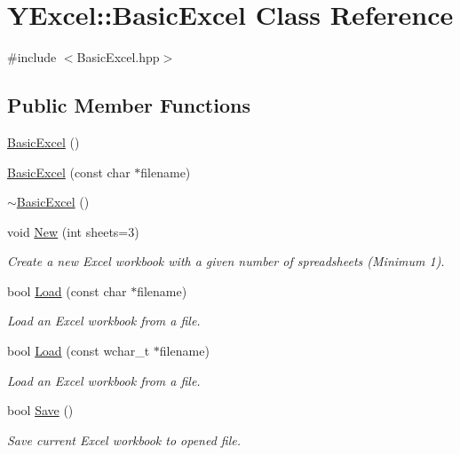 \hypertarget{class_y_excel_1_1_basic_excel}{}\section{Y\+Excel\+:\+:Basic\+Excel Class Reference}
\label{class_y_excel_1_1_basic_excel}


{\ttfamily \#include $<$Basic\+Excel.\+hpp$>$}

\subsection*{Public Member Functions}
\begin{DoxyCompactItemize}
\item 
\hyperlink{class_y_excel_1_1_basic_excel_ad2cb116dc96aa380399de4c1d0a93eb7}{Basic\+Excel} ()
\item 
\hyperlink{class_y_excel_1_1_basic_excel_ade0a7e1f99dc56cea809c7db31b34f05}{Basic\+Excel} (const char $\ast$filename)
\item 
\hyperlink{class_y_excel_1_1_basic_excel_a5f0fba85f6f0d10706430f0f00f93945}{$\sim$\+Basic\+Excel} ()
\item 
void \hyperlink{class_y_excel_1_1_basic_excel_a61cbf0e9d5bca97c10df212f8219b6f1}{New} (int sheets=3)
\begin{DoxyCompactList}\small\item\em Create a new Excel workbook with a given number of spreadsheets (Minimum 1). \end{DoxyCompactList}\item 
bool \hyperlink{class_y_excel_1_1_basic_excel_a7dc1a3b9d95654129f0ada8eb0d6ea28}{Load} (const char $\ast$filename)
\begin{DoxyCompactList}\small\item\em Load an Excel workbook from a file. \end{DoxyCompactList}\item 
bool \hyperlink{class_y_excel_1_1_basic_excel_a66b588c8f1d1aae6a6a03d57d5a15cf5}{Load} (const wchar\+\_\+t $\ast$filename)
\begin{DoxyCompactList}\small\item\em Load an Excel workbook from a file. \end{DoxyCompactList}\item 
bool \hyperlink{class_y_excel_1_1_basic_excel_acae9790120b1827808184d1bd7870765}{Save} ()
\begin{DoxyCompactList}\small\item\em Save current Excel workbook to opened file. \end{DoxyCompactList}\item 

\end{DoxyCompactItemize}
